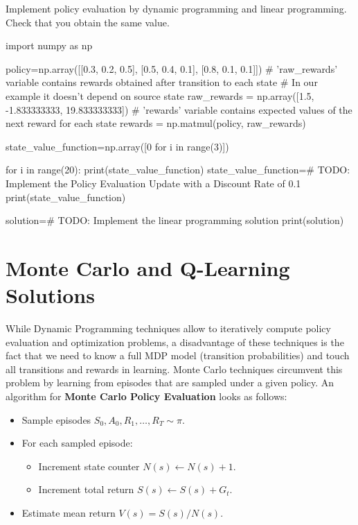 \begin{exercise}
\label{exercise:PolicyEvaluation}
Implement policy evaluation by dynamic programming and linear programming. Check that you obtain the same value.

\begin{python}
import numpy as np

policy=np.array([[0.3, 0.2, 0.5], [0.5, 0.4, 0.1], [0.8, 0.1, 0.1]])
# 'raw_rewards' variable contains rewards obtained after transition to each state
# In our example it doesn't depend on source state
raw_rewards = np.array([1.5, -1.833333333, 19.833333333])
# 'rewards' variable contains expected values of the next reward for each state
rewards = np.matmul(policy, raw_rewards)

state_value_function=np.array([0 for i in range(3)])

for i in range(20):
    print(state_value_function)
    state_value_function=# TODO: Implement the Policy Evaluation Update with a Discount Rate of 0.1
print(state_value_function)

solution=# TODO: Implement the linear programming solution
print(solution)
\end{python}
\end{exercise}

\section{Monte Carlo and Q-Learning Solutions}

While Dynamic Programming techniques allow to iteratively compute policy evaluation and optimization problems, a disadvantage of these techniques is the fact that we need to know a full MDP model (transition probabilities) and touch all transitions and rewards in learning. Monte Carlo techniques circumvent this problem by learning from episodes that are sampled under a given policy. An algorithm for \textbf{Monte Carlo Policy Evaluation} looks as follows: 
\begin{itemize}
  \item Sample episodes $S_0, A_0, R_1, \ldots, R_T \sim \pi$.
    \item For each sampled episode:
  \begin{itemize}
  \item Increment state counter $N(s) \leftarrow N(s) + 1$.
  \item Increment total return $S(s) \leftarrow S(s) + G_t$.
    \end{itemize}
  \item Estimate mean return $V(s) = S(s)/N(s)$.
  \end{itemize}

